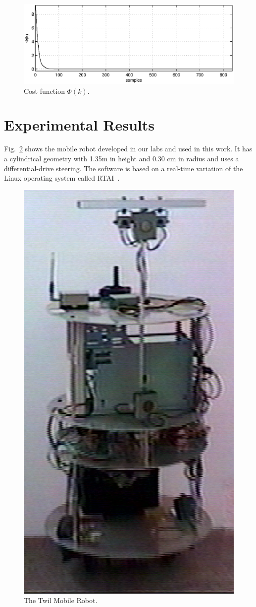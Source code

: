 \documentclass[conference]{IEEEtran} %
\begin{document}
\begin{figure}[H]\begin{center}
    \includegraphics[width=.99\linewidth]{Figures/cost.eps}
    \caption{Cost function $\Phi(k)$.}
    \label{fig:cost}
\end{center}\end{figure}


\section{Experimental Results}
\label{sec:exp}

Fig.~\ref{fig:twil} shows the mobile robot developed in our labs and used in this work. It has a cylindrical geometry with 1.35m in height and 0.30 cm in radius and uses a differential-drive steering. The software is based on a real-time variation of the Linux operating system called RTAI~\cite{Dozio:2003}.

\begin{figure}[htbp]
\begin{center}
	\includegraphics[width=0.65\linewidth]{Figures/twil6.ps}
	\caption{The Twil Mobile Robot.}
	\label{fig:twil}
\end{center}
\end{figure}
\end{document}
